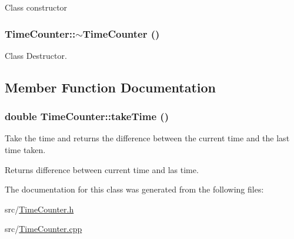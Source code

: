 Class constructor \hypertarget{classTimeCounter_aa8790b82b41f08d9823700060f7a01dc}{
\subsubsection[{$\sim$TimeCounter}]{\setlength{\rightskip}{0pt plus 5cm}TimeCounter::$\sim$TimeCounter ()}}
\label{classTimeCounter_aa8790b82b41f08d9823700060f7a01dc}
Class Destructor. 

\subsection{Member Function Documentation}
\hypertarget{classTimeCounter_af579a764cbad73c606938f5c12b1776e}{
\subsubsection[{takeTime}]{\setlength{\rightskip}{0pt plus 5cm}double TimeCounter::takeTime ()}}
\label{classTimeCounter_af579a764cbad73c606938f5c12b1776e}
Take the time and returns the difference between the current time and the last time taken. \begin{DoxyReturn}{Returns}
difference between current time and las time. 
\end{DoxyReturn}


The documentation for this class was generated from the following files:\begin{DoxyCompactItemize}
\item 
src/\hyperlink{TimeCounter_8h}{TimeCounter.h}\item 
src/\hyperlink{TimeCounter_8cpp}{TimeCounter.cpp}\end{DoxyCompactItemize}
